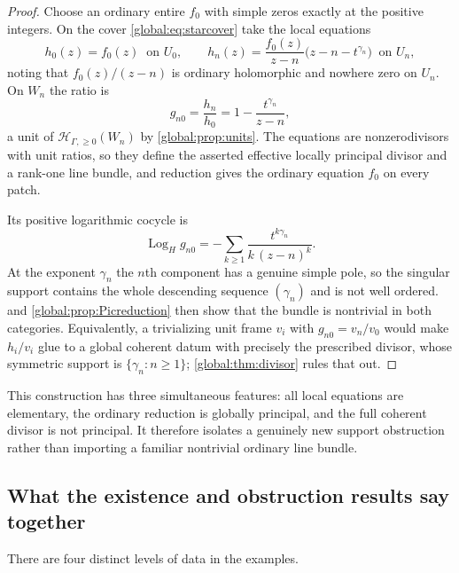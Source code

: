 \documentclass[11pt,letterpaper]{article}
\theoremstyle{definition}
\theoremstyle{remark}
\newcommand{\HI}{\mathscr H_{\Gamma,\ge0}}
\newcommand{\LogH}{\operatorname{Log}_{H}}
\numberwithin{equation}{section}
\begin{document}
\begin{proof}
Choose an ordinary entire $f_0$ with simple zeros exactly at the positive integers. On the cover \eqref{global:eq:starcover} take the local equations
\[
  h_0(z)=f_0(z)\ \text{ on }U_0,
  \qquad
  h_n(z)=\frac{f_0(z)}{z-n}\bigl(z-n-t^{\gamma_n}\bigr)\ \text{ on }U_n,
\]
noting that $f_0(z)/(z-n)$ is ordinary holomorphic and nowhere zero on $U_n$. On $W_n$ the ratio is
\begin{equation}\label{global:eq:divisortransition}
  g_{n0}=\frac{h_n}{h_0}=1-\frac{t^{\gamma_n}}{z-n},
\end{equation}
a unit of $\HI(W_n)$ by \cref{global:prop:units}. The equations are nonzerodivisors with unit ratios, so they define the asserted effective locally principal divisor and a rank-one line bundle, and reduction gives the ordinary equation $f_0$ on every patch.

Its positive logarithmic cocycle is
\begin{equation}\label{global:eq:divisorlog}
  \LogH g_{n0}=-\sum_{k\ge1}\frac{t^{k\gamma_n}}{k\,(z-n)^k}.
\end{equation}
At the exponent $\gamma_n$ the $n$th component has a genuine simple pole, so the singular support contains the whole descending sequence $(\gamma_n)$ and is not well ordered.  and \cref{global:prop:Picreduction} then show that the bundle is nontrivial in both categories. Equivalently, a trivializing unit frame $v_i$ with $g_{n0}=v_n/v_0$ would make $h_i/v_i$ glue to a global coherent datum with precisely the prescribed divisor, whose symmetric support is $\{\gamma_n:n\ge1\}$; \cref{global:thm:divisor} rules that out.
\end{proof}

This construction has three simultaneous features: all local equations are elementary, the ordinary reduction is globally principal, and the full coherent divisor is not principal. It therefore isolates a genuinely new support obstruction rather than importing a familiar nontrivial ordinary line bundle.

\subsection{What the existence and obstruction results say together}

There are four distinct levels of data in the examples.
\end{document}
